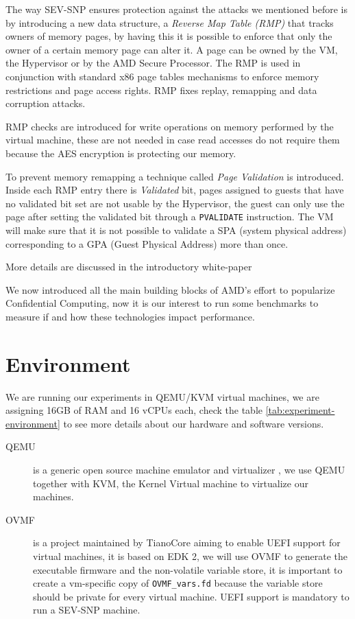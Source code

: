 \documentclass[twocolumn]{article}
\begin{document}
The way SEV-SNP ensures protection against the attacks we mentioned before is by introducing a new data structure, a \textit{Reverse Map Table (RMP)} that tracks owners of memory pages, by having this it is possible to enforce that only the owner of a certain memory page can alter it. A page can be owned by the VM, the Hypervisor or by the AMD Secure Processor. The RMP is used in conjunction with standard x86 page tables mechanisms to enforce memory restrictions and page access rights. RMP fixes replay, remapping and data corruption attacks. 

RMP checks are introduced for write operations on memory performed by the virtual machine, these are not needed in case  read accesses do not require them because the AES encryption is protecting our memory.

To prevent memory remapping a technique called \textit{Page Validation} is introduced. Inside each RMP entry there is \textit{Validated} bit, pages assigned to guests that have no validated bit set are not usable by the Hypervisor, the guest can only use the page after setting the validated bit through a \texttt{PVALIDATE} instruction. The VM will make sure that it is not possible to validate a SPA (system physical address) corresponding to a GPA (Guest Physical Address) more than once.
 
More details are discussed in the introductory white-paper \cite{sev-snp}

We now introduced all the main building blocks of AMD's effort to popularize Confidential Computing, now it is our interest to run some benchmarks to measure if and how these technologies impact performance.

\section{Environment}
\label{sec:environment}
    
We are running our experiments in QEMU/KVM virtual machines, we are assigning 16GB of RAM and 16 vCPUs each, check the table \ref{tab:experiment-environment} to see more details about our hardware and software versions. 

\begin{description}
    \item[QEMU] is a generic open source machine emulator and virtualizer \cite{qemu}, we use QEMU together with KVM, the Kernel Virtual machine to virtualize our machines.
    \item[OVMF] is a project maintained by TianoCore \cite{ovmf} aiming to enable UEFI support for virtual machines, it is based on EDK 2, we will use OVMF to generate the executable firmware and the non-volatile variable store, it is important to create a vm-specific copy of \texttt{OVMF\_vars.fd} because the variable store should be private for every virtual machine. UEFI support is mandatory to run a SEV-SNP machine.
\end{description}
\end{document}
